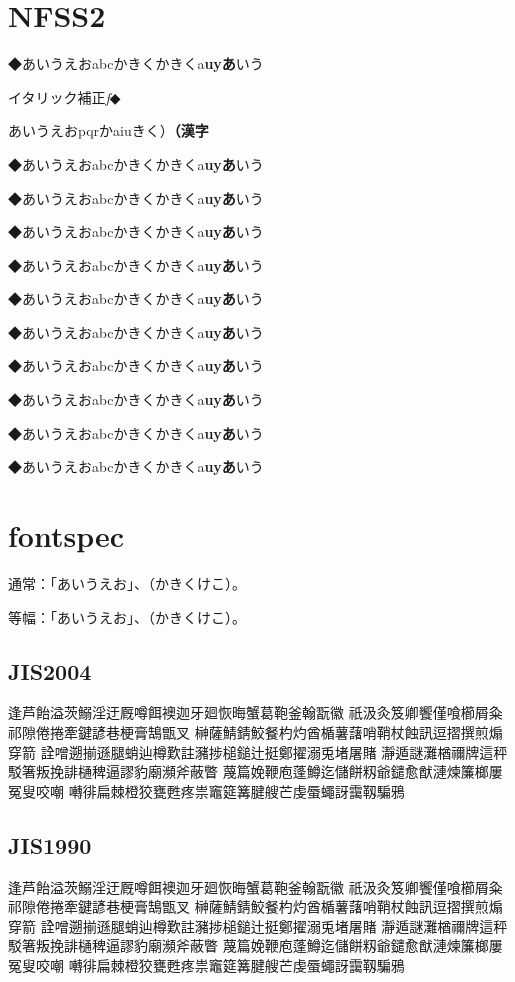 \documentclass{article}
\begin{document}
\section{NFSS2}


◆あいうえおabcかきく{\gt かきくa{\bf uyあ}いう}

{イタリック補正\textit{f}◆\par}

あいうえおpqr{\dr かaiu}きく）{\bf （漢字}

{\tiny ◆あいうえおabcかきく{\gt かきくa{\bf uyあ}いう}}

{\scriptsize ◆あいうえおabcかきく{\gt かきくa{\bf uyあ}いう}}

{\footnotesize ◆あいうえおabcかきく{\gt かきくa{\bf uyあ}いう}}

{\small ◆あいうえおabcかきく{\gt かきくa{\bf uyあ}いう}}

{\normalsize ◆あいうえおabcかきく{\gt かきくa{\bf uyあ}いう}}

{\large ◆あいうえおabcかきく{\gt かきくa{\bf uyあ}いう}}

{\Large ◆あいうえおabcかきく{\gt かきくa{\bf uyあ}いう}}

{\LARGE ◆あいうえおabcかきく{\gt かきくa{\bf uyあ}いう}}

{\huge ◆あいうえおabcかきく{\gt かきくa{\bf uyあ}いう}}

{\Huge ◆あいうえおabcかきく{\gt かきくa{\bf uyあ}いう}}

\section{fontspec}

通常：「あいうえお」、（かきくけこ）。

{
\noindent 等幅：「あいうえお」、（かきくけこ）。
}

\subsection{JIS2004}
逢芦飴溢茨鰯淫迂厩噂餌襖迦牙廻恢晦蟹葛鞄釜翰翫徽
祇汲灸笈卿饗僅喰櫛屑粂祁隙倦捲牽鍵諺巷梗膏鵠甑叉
榊薩鯖錆鮫餐杓灼酋楯薯藷哨鞘杖蝕訊逗摺撰煎煽穿箭
詮噌遡揃遜腿蛸辿樽歎註瀦捗槌鎚辻挺鄭擢溺兎堵屠賭
瀞遁謎灘楢禰牌這秤駁箸叛挽誹樋稗逼謬豹廟瀕斧蔽瞥
蔑篇娩鞭庖蓬鱒迄儲餅籾爺鑓愈猷漣煉簾榔屢冤叟咬嘲
囀徘扁棘橙狡甕甦疼祟竈筵篝腱艘芒虔蜃蠅訝靄靱騙鴉

\subsection{JIS1990}
{\ipajisninety
逢芦飴溢茨鰯淫迂厩噂餌襖迦牙廻恢晦蟹葛鞄釜翰翫徽
祇汲灸笈卿饗僅喰櫛屑粂祁隙倦捲牽鍵諺巷梗膏鵠甑叉
榊薩鯖錆鮫餐杓灼酋楯薯藷哨鞘杖蝕訊逗摺撰煎煽穿箭
詮噌遡揃遜腿蛸辿樽歎註瀦捗槌鎚辻挺鄭擢溺兎堵屠賭
瀞遁謎灘楢禰牌這秤駁箸叛挽誹樋稗逼謬豹廟瀕斧蔽瞥
蔑篇娩鞭庖蓬鱒迄儲餅籾爺鑓愈猷漣煉簾榔屢冤叟咬嘲
囀徘扁棘橙狡甕甦疼祟竈筵篝腱艘芒虔蜃蠅訝靄靱騙鴉
}
\end{document}
